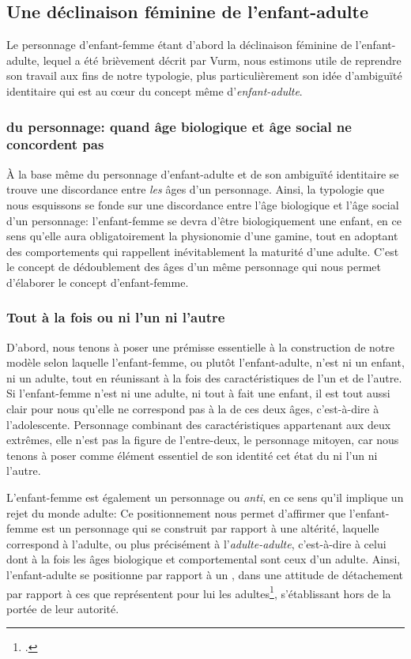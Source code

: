 \subsection{Une déclinaison féminine de l'enfant-adulte}
Le personnage d'enfant-femme étant d'abord la déclinaison féminine de l'enfant-adulte, lequel a été brièvement décrit par Vurm, nous estimons utile de reprendre son travail aux fins de notre typologie, plus particulièrement son idée d'ambiguïté identitaire qui est au c\oe{}ur du concept même d'\textit{enfant-adulte}.

\subsubsection{ du personnage: quand âge biologique et âge social ne concordent pas}
À la base même du personnage d'enfant-adulte et de son ambiguïté identitaire se trouve une discordance entre \textit{les} âges d'un personnage.
Ainsi, la typologie que nous esquissons se fonde sur une discordance entre l'âge biologique et l'âge social d'un personnage: l'enfant-femme se devra d'être biologiquement une enfant, en ce sens qu'elle aura obligatoirement la physionomie d'une gamine, tout en adoptant des comportements qui rappellent inévitablement la maturité d'une adulte.
C'est le concept de dédoublement des âges d'un même personnage qui nous permet d'élaborer le concept d'enfant-femme.

\subsubsection{Tout à la fois ou ni l'un ni l'autre}
D'abord, nous tenons à poser une prémisse essentielle à la construction de notre modèle selon laquelle l'enfant-femme, ou plutôt l'enfant-adulte, n'est ni un enfant, ni un adulte, tout en réunissant à la fois des caractéristiques de l'un et de l'autre.
Si l'enfant-femme n'est ni une adulte, ni tout à fait une enfant, il est tout aussi clair pour nous qu'elle ne correspond pas à la  de ces deux âges, c'est-à-dire à l'adolescente. Personnage combinant des caractéristiques appartenant aux deux extrêmes, elle n'est pas la figure de l'entre-deux, le personnage mitoyen, car nous tenons à poser comme élément essentiel de son identité cet état du ni l'un ni l'autre.
\par
L'enfant-femme est également un personnage  ou \textit{anti}, en ce sens qu'il implique un rejet du monde adulte: 
Ce positionnement nous permet d'affirmer que l'enfant-femme est un personnage qui se construit par rapport à une altérité, laquelle correspond à l'adulte, ou plus précisément à l'\textit{adulte-adulte}, c'est-à-dire à celui dont à la fois les âges biologique et comportemental sont ceux d'un adulte. Ainsi, l'enfant-adulte se positionne par rapport à un , dans une attitude de détachement par rapport à ces  que représentent pour lui les adultes\footcite[100]{Vurm2014}, s'établissant hors de la portée de leur autorité.


